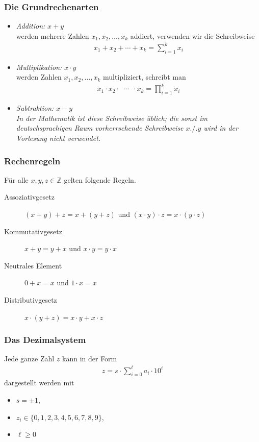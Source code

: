 \documentclass{beamer}
\renewcommand{\emph}[1]{{\textcolor{solarizedRed}{\itshape #1}}}
\newcommand\ZZ{\mathbb Z}
\newcommand{\ue}{\"u}
\begin{document}
\begin{frame}\frametitle{Die Grundrechenarten}
	\begin{block}{}
		\begin{itemize}
			\item \emph{Addition:} $x+y$\\
				werden mehrere Zahlen $x_1,x_2,\ldots,x_k$ addiert, verwenden wir die Schreibweise
				\begin{align*}
					x_1+x_2+\cdots+x_k=\sum_{i=1}^kx_i
				\end{align*}
			\item \emph{Multiplikation:} $x\cdot y$\\
				werden Zahlen $x_1,x_2,\ldots,x_k$ multipliziert, schreibt man
				\begin{align*}
					x_1\cdot x_2\cdot \enspace\cdots\enspace\cdot x_k=\prod_{i=1}^kx_i
				\end{align*}
			\item \emph{Subtraktion:} $x-y$\\
				{\itshape In der Mathematik ist diese Schreibweise \ue blich; die sonst im deutschsprachigen Raum vorherrschende Schreibweise $x./.y$ wird in der Vorlesung nicht verwendet.}
		\end{itemize}
	\end{block}
\end{frame}

\begin{frame}\frametitle{Rechenregeln}
	\begin{block}{}
		F\ue r alle $x,y,z\in\ZZ$ gelten folgende Regeln.
		\begin{description}
			\item[Assoziativgesetz] $(x+y)+z=x+(y+z)$ und $(x\cdot y)\cdot z=x\cdot(y\cdot z)$
			\item[Kommutativgesetz] $x+y=y+x$ und $x\cdot y=y\cdot x$
			\item[Neutrales Element] $0+x=x$ und $1\cdot x=x$
			\item[Distributivgesetz] $x\cdot(y+z)=x\cdot y+x\cdot z$
		\end{description}
	\end{block}
\end{frame}

\begin{frame}\frametitle{Das Dezimalsystem}
\begin{block}{}
Jede ganze Zahl $z$ kann in der Form
	\begin{align*}
		z=s\cdot\sum_{i=0}^\ell a_i\cdot 10^i
	\end{align*}
	dargestellt werden mit
\begin{itemize}
\item $s=\pm1$,
\item $z_i\in\{0,1,2,3,4,5,6,7,8,9\}$,
\item $\ell\geq0$
\end{itemize}
\end{block}
\end{frame}
\end{document}
